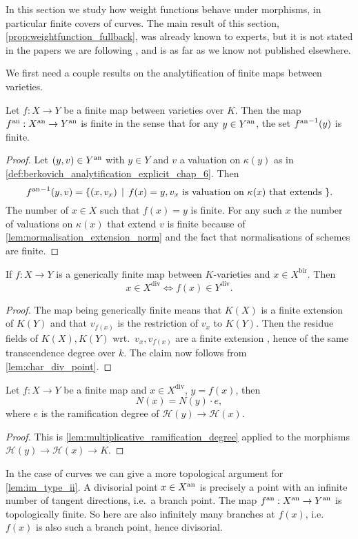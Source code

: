 In this section we study how weight functions behave under morphisms, in particular finite covers of curves. 
The main result of this section, \cref{prop:weightfunction_fullback}, was already known to experts, but it is not stated in the papers we are following \cite{bakerWeightFunctionsBerkovich2016,nicaiseBerkovichSkeletaBirational2016,mustataWeightFunctionsNonArchimedean2015}, and is as far as we know not published elsewhere. 

We first need a couple results on the analytification of finite maps between varieties. 

\begin{lemma}
	Let $f: X \to Y$ be a finite map between varieties over  $K$. 
Then the map $f{}^{\text{an}}: X{}^{\text{an}} \to Y{}^{\text{an}}$ is finite in the sense that for any $y \in Y{}^{\text{an}}$, the set ${f{}^{\text{an}}}^{-1}(y)$ is finite. 
\end{lemma}
\begin{proof}
	Let $(y, v) \in Y{}^{\text{an}}$ with $y \in Y$ and $v$ a valuation on $\kappa(y)$ as in \cref{def:berkovich_analytification_explicit_chap_6}. 
	Then \[
		{f\an}^{-1} (y, v) = \{(x, v_x) \st f(x) = y, v_x \text{ is valuation on $\kappa(x)$ that extends }  \} 
	.\]
	The number of $x \in X$ such that $f(x) = y$ is finite. 
	For any such $x$ the number of valuations on $\kappa(x)$ that extend $v$ is finite because of \cref{lem:normalisation_extension_norm} and the fact that normalisations of schemes are finite. 
\end{proof}

\begin{lemma}\label{lem:im_type_ii}
	If $f: X \to Y$ is a generically finite map between $K$-varieties and $x \in X^{\text{bir}}$. Then
	\[
		x \in X^\text{div} \iff f(x) \in Y^\text{div}
	.\] 
\end{lemma}
\begin{proof}
	The map being generically finite means that $K(X)$ is a finite extension of $K(Y)$ and that $v_{f(x)}$ is the restriction of $v_x$ to $K(Y)$. 
	Then the residue fields of $K(X), K(Y)$ wrt.\ $v_x, v_{f(x)}$ are a finite extension , hence of the same transcendence degree over $k$. 
	The claim now follows from \cref{lem:char_div_point}.
\end{proof}
\begin{lemma}
	Let $f: X \to Y$ be a finite map and $x \in X^{\text{div}}$, $y = f(x)$, 
	then \[
		N(x) = N(y)\cdot e
	,\]
	where $e$ is the ramification degree of $\mathcal{H} (y) \to \mathcal{H} (x)$. 
\end{lemma}
\begin{proof}
	This is \cref{lem:multiplicative_ramification_degree} applied to the morphisms $\mathcal{H} (y) \to \mathcal{H} (x) \to K$.
\end{proof}
\begin{remark}
	In the case of curves we can give a more topological argument for \cref{lem:im_type_ii}. 
	A divisorial point $x \in X{}^{\text{an}}$ is precisely a point with an infinite number of tangent directions, i.e.\ a branch point.
	The map $f{}^{\text{an}}: X{}^{\text{an}} \to Y{}^{\text{an}} $ is topologically finite.
	So here are also infinitely many branches at $f(x)$, i.e.\ $f(x)$ is also such a branch point, hence divisorial. 	
\end{remark}


